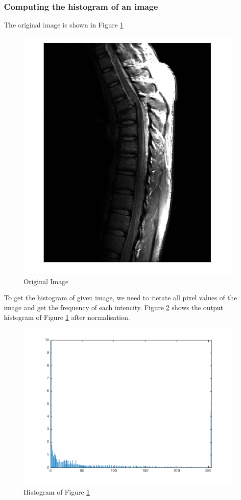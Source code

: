 \subsubsection{Computing the histogram of an image}
The original image is shown in Figure \ref{fig:hisoriginal}
\begin{figure}[h]
	\centering
	\includegraphics[scale=0.2]{0308}
	\caption{Original Image}
	\label{fig:hisoriginal}
\end{figure}
To get the histogram of given image, we need to iterate all pixel values of the image and get the frequency of each intencity. Figure \ref{fig:hishist1} shows the output histogram of Figure \ref{fig:hisoriginal} after normalisation.
\begin{figure}[h]
	\centering
	\includegraphics[scale=0.4]{historg}
	\caption{Histogram of Figure \ref{fig:hisoriginal}}
	\label{fig:hishist1}
\end{figure}